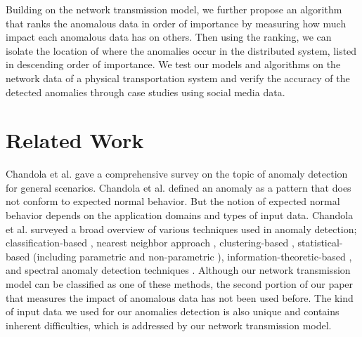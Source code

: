 \documentclass[conference]{IEEEtran.1.8}
\begin{document}
Building on the network transmission model, we further propose an algorithm that ranks the anomalous data in order of importance by measuring how much impact each anomalous data has on others. Then using the ranking, we can isolate the location of where the anomalies occur in the distributed system, listed in descending order of importance. We test our models and algorithms on the network data of a physical transportation system and verify the accuracy of the detected anomalies through case studies using social media data.


\section{Related Work}
\label{sec:related}



Chandola et al. \cite{Chandola2009} gave a comprehensive survey on the topic of anomaly detection for general scenarios. Chandola et al. defined an anomaly as a pattern that does not conform to expected normal behavior. But the notion of expected normal behavior depends on the application domains and types of input data. Chandola et al. surveyed a broad overview of various techniques used in anomaly detection; classification-based \cite{Stefano2000, Barbara2001}, nearest neighbor approach \cite{Otey2006}, clustering-based \cite{He2003}, statistical-based (including parametric \cite{Eskin2000} and non-parametric \cite{Chow2002}), information-theoretic-based \cite{Ando2007}, and spectral anomaly detection techniques \cite{Agovic2009}. Although our network transmission model can be classified as one of these methods, the second portion of our paper that measures the impact of anomalous data has not been used before. The kind of input data we used for our anomalies detection is also unique and contains inherent difficulties, which is addressed by our network transmission model.
\end{document}
